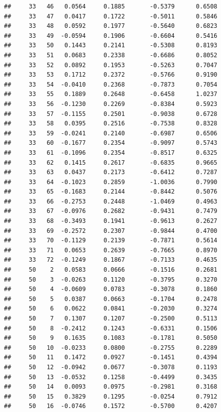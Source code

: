 \documentclass[
]{article}
\begin{document}
\begin{verbatim}
##     33   46   0.0564     0.1885       -0.5379      0.6508  
##     33   47   0.0417     0.1722       -0.5011      0.5846  
##     33   48   0.0592     0.1977       -0.5640      0.6823  
##     33   49  -0.0594     0.1906       -0.6604      0.5416  
##     33   50   0.1443     0.2141       -0.5308      0.8193  
##     33   51   0.0683     0.2338       -0.6686      0.8052  
##     33   52   0.0892     0.1953       -0.5263      0.7047  
##     33   53   0.1712     0.2372       -0.5766      0.9190  
##     33   54  -0.0410     0.2368       -0.7873      0.7054  
##     33   55   0.1889     0.2648       -0.6458      1.0237  
##     33   56  -0.1230     0.2269       -0.8384      0.5923  
##     33   57  -0.1155     0.2501       -0.9038      0.6728  
##     33   58   0.0395     0.2516       -0.7538      0.8328  
##     33   59  -0.0241     0.2140       -0.6987      0.6506  
##     33   60  -0.1677     0.2354       -0.9097      0.5743  
##     33   61  -0.1096     0.2354       -0.8517      0.6325  
##     33   62   0.1415     0.2617       -0.6835      0.9665  
##     33   63   0.0437     0.2173       -0.6412      0.7287  
##     33   64  -0.1023     0.2859       -1.0036      0.7990  
##     33   65  -0.1683     0.2144       -0.8442      0.5076  
##     33   66  -0.2753     0.2448       -1.0469      0.4963  
##     33   67  -0.0976     0.2682       -0.9431      0.7479  
##     33   68  -0.3493     0.1941       -0.9613      0.2627  
##     33   69  -0.2572     0.2307       -0.9844      0.4700  
##     33   70  -0.1129     0.2139       -0.7871      0.5614  
##     33   71   0.0653     0.2639       -0.7665      0.8970  
##     33   72  -0.1249     0.1867       -0.7133      0.4635  
##     50    2   0.0583     0.0666       -0.1516      0.2681  
##     50    3  -0.0263     0.1120       -0.3795      0.3270  
##     50    4  -0.0609     0.0783       -0.3078      0.1860  
##     50    5   0.0387     0.0663       -0.1704      0.2478  
##     50    6   0.0622     0.0841       -0.2030      0.3274  
##     50    7   0.1307     0.1207       -0.2500      0.5113  
##     50    8  -0.2412     0.1243       -0.6331      0.1506  
##     50    9   0.1635     0.1083       -0.1781      0.5050  
##     50   10  -0.0233     0.0800       -0.2755      0.2289  
##     50   11   0.1472     0.0927       -0.1451      0.4394  
##     50   12  -0.0942     0.0677       -0.3078      0.1193  
##     50   13  -0.0532     0.1258       -0.4499      0.3435  
##     50   14   0.0093     0.0975       -0.2981      0.3168  
##     50   15   0.3829     0.1295       -0.0254      0.7912  
##     50   16  -0.0746     0.1572       -0.5700      0.4207  

\end{verbatim}
\end{document}
